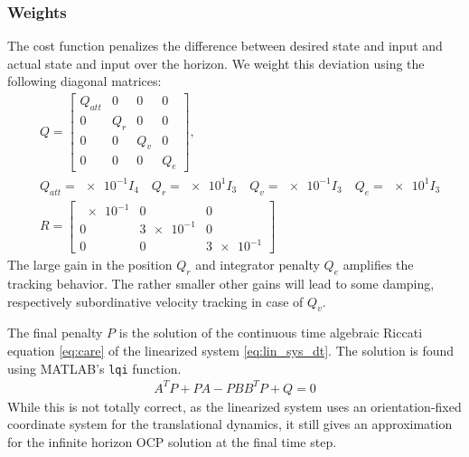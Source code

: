 \subsubsection{Weights}
The cost function penalizes the difference between desired state and input and actual state and input over the horizon. We weight this deviation using the following diagonal matrices:
\begin{align}
&Q = \begin{bmatrix}
Q_{att} & 0 & 0 & 0 \\
0 & Q_{r} & 0 & 0 \\
0 & 0 & Q_{v} & 0 \\
0 & 0 & 0 & Q_{e}
\end{bmatrix},\\
&Q_{att}= \num{e-1} I_4  \quad  Q_{r} = \num{e1} I_3 \quad
Q_{v} = \num{e-1} I_3  \quad Q_{e} = \num{e1} I_3 \nonumber \\
&R = \begin{bmatrix}
\num{e-1} & 0 & 0 \\
0 & \num{3e-1} & 0 \\
0 & 0 & \num{3e-1}
\end{bmatrix} \label{eq:nmpc_input_penalty}
\end{align}
The large gain in the position $Q_{r}$ and integrator penalty $Q_{e}$ amplifies the tracking behavior. The rather smaller other gains will lead to some damping, respectively subordinative velocity tracking in case of $Q_{v}$.

The final penalty $P$ is the solution of the continuous time algebraic Riccati equation \ref{eq:care} of the linearized system \ref{eq:lin_sys_dt}. The solution is found using MATLAB's \texttt{lqi} function.
\begin{align}
A^TP+PA-PBB^TP+Q=0\label{eq:care}
\end{align}
While this is not totally correct, as the linearized system uses an orientation-fixed coordinate system for the translational dynamics, it still gives an approximation for the infinite horizon OCP solution at the final time step.
